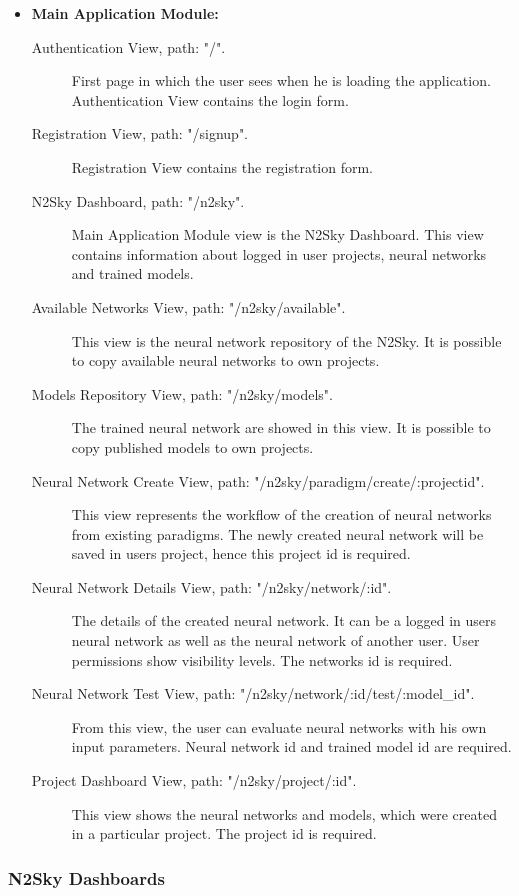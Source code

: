\begin{itemize}
\item \textbf{Main Application Module:}
\begin{description}
\item[Authentication View, path: "/".] First page in which the user sees when he is loading the application. Authentication View contains the login form.
\item[Registration View, path: "/signup".] Registration View contains the registration form.
 \item[N2Sky Dashboard, path: "/n2sky".] Main Application Module view is the N2Sky Dashboard. This view contains information about logged in user projects, neural networks and trained models.  
\item[Available Networks View, path: "/n2sky/available".] This view is the neural network repository of the N2Sky. It is possible to copy available neural networks to own projects.
\item[Models Repository View, path: "/n2sky/models".] The trained neural network are showed in this view. It is possible to copy published models to own projects.
\item[Neural Network Create View, path: "/n2sky/paradigm/create/:projectid".] This view represents the workflow of the creation of neural networks from existing paradigms. The newly created neural network will be saved in users project, hence this project id is required.  
\item[Neural Network Details View, path: "/n2sky/network/:id".] The details of the created neural network. It can be a logged in users neural network as well as the neural network of another user. User permissions show visibility levels. The networks id is required. 
\item[Neural Network Test View, path: "/n2sky/network/:id/test/:model\_id".] From this view, the user can evaluate neural networks with his own input parameters. Neural network id and trained model id are required. 
\item[Project Dashboard View, path: "/n2sky/project/:id".] This view shows the neural networks and models, which were created in a particular project. The project id is required.
\end{description}


\end{itemize}






\subsubsection{N2Sky Dashboards}\label{N2Sky Dashboards}

